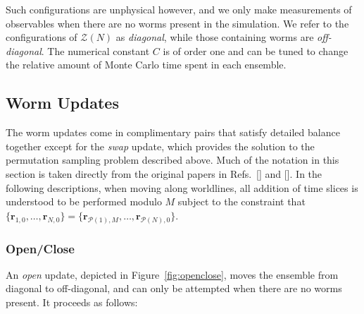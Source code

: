 \documentclass[prb,aps,amssym,nofootinbib,floatfix,notitlepage]{revtex4-1}
\renewcommand{\vec}[1]{\boldsymbol{#1}}
\begin{document}
%
Such configurations are unphysical however, and we only make measurements of
observables when there are no worms present in the simulation. We refer to the
configurations of $\mathcal{Z}(N)$ as \emph{diagonal}, while those containing
worms are \emph{off-diagonal}. The numerical constant $C$ is of order one and
can be tuned to change the relative amount of Monte Carlo time spent in each
ensemble. 


\subsection{Worm Updates}
The worm updates come in complimentary pairs that satisfy detailed balance
together except for the \emph{swap} update, which provides the solution to the
permutation sampling problem described above. Much of the notation in this
section is taken directly from the original papers in
Refs.~[] and [].
In the following descriptions, when moving along worldlines, all addition of
time slices is understood to be performed modulo $M$ subject to the constraint
that $\{\vec{r}_{1,0},\ldots,\vec{r}_{N,0}\} = 
\{\vec{r}_{{\mathcal{P}}(1),M},\ldots,\vec{r}_{{\mathcal{P}}(N),0}\}$.

\subsubsection{Open/Close}
An \emph{open} update, depicted in Figure~\ref{fig:openclose}, moves the
ensemble from diagonal to off-diagonal, and can only be attempted when there
are no worms present.  
It proceeds as follows:
\end{document}
